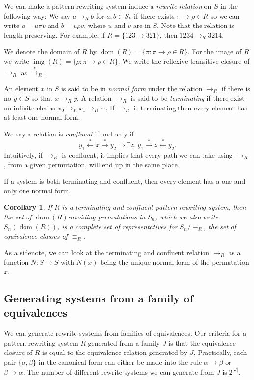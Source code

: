 \documentclass[a4paper, 11pt, english]{article}
\newcommand{\patternrule}{ \to \!}
\newtheorem{corollary}[theorem]{Corollary}
\theoremstyle{definition}
\newcommand{\Sym}{S}
\newcommand{\from}{\leftarrow}
\newcommand{\tostar}{\stackrel{*}{\to}}
\newcommand{\fromstar}{\stackrel{*}{\from}}
\DeclareMathOperator{\dom}{dom}
\DeclareMathOperator{\img}{img}
\begin{document}
We can make a pattern-rewriting system induce a \emph{rewrite relation} on $\Sym$ in the following way: We say
$a \to_R b$ for $a, b \in \Sym_k$ if there exists $\pi \patternrule \rho \in R$ so
we can write $a = u \pi v$ and $b = u \rho v$, where
$u$ and $v$ are in $\Sym$. Note that the relation is
length-preserving. For example, if $R = \{123 \patternrule 321\}$, then $1234 \to_R 3214$. 

We denote the domain of $R$ by $\dom(R) = \{\pi : \pi \patternrule
\rho \in R\}$. For the image of $R$ we write $\img(R) = \{\rho : \pi
\patternrule \rho \in R\}$. We write the reflexive transitive closure of
$\to_R$ as $\tostar_R$. 

An element $x$ in $\Sym$ is said to be in \emph{normal form} under the relation $\to_R$
if there is no $y \in \Sym$ so that $x \to_R y$. A relation $\to_R$ is said to be
\emph{terminating} if there exist no infinite chains $x_0 \to_R x_1 \to_R \cdots$. If
$\to_R$ is terminating then every element has at least one normal form. 

We say a relation is \emph{confluent} if and only if
$$
    y_1 \fromstar x \tostar y_2 \Longrightarrow 
    \exists z. \  y_1 \tostar z \fromstar y_2.
$$
Intuitively, if $\to_R$ is confluent, it implies that every path we can
take using $\to_R$, from a given permutation, will end up in the same place. 

If a system is both terminating and confluent, then every element has a one and
only one normal form.

\begin{corollary}
    If $R$ is a terminating and confluent pattern-rewriting system, then the set of
    $\dom(R)$-avoiding permutations in $S_n$, which we also write $S_n(\dom(R))$, is a complete set of
    representatives for $S_n / \equiv_R$, the set of equivalence classes of $\equiv_R$.
\end{corollary}

As a sidenote, we can look at the terminating and confluent relation $\to_R$ as a function 
$N : \Sym \to \Sym$ with $N(x)$ being the unique normal form of the permutation $x$.

\subsection{Generating systems from a family of equivalences}

We can generate rewrite systems from families of equivalences. Our criteria for a pattern-rewriting
system $R$ generated from a family $J$ is that the equivalence closure of $R$ is equal to the
equivalence relation generated by $J$. 
Practically, each pair $\{\alpha, \beta \}$ in the canonical form can either be made into the rule $\alpha
\patternrule \beta$ or $\beta \patternrule \alpha$. The number of different rewrite systems we can
generate from $J$ is $2^{|J|}$.
\end{document}
